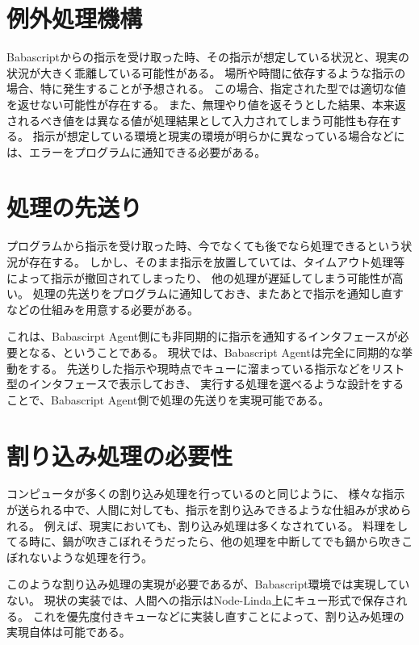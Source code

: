 \section{例外処理機構}\label{ux4f8bux5916ux51e6ux7406ux6a5fux69cb}

Babascriptからの指示を受け取った時、その指示が想定している状況と、現実の状況が大きく乖離している可能性がある。
場所や時間に依存するような指示の場合、特に発生することが予想される。
この場合、指定された型では適切な値を返せない可能性が存在する。
また、無理やり値を返そうとした結果、本来返されるべき値をは異なる値が処理結果として入力されてしまう可能性も存在する。
指示が想定している環境と現実の環境が明らかに異なっている場合などには、エラーをプログラムに通知できる必要がある。

\section{処理の先送り}\label{ux51e6ux7406ux306eux5148ux9001ux308a}

プログラムから指示を受け取った時、今でなくても後でなら処理できるという状況が存在する。
しかし、そのまま指示を放置していては、タイムアウト処理等によって指示が撤回されてしまったり、
他の処理が遅延してしまう可能性が高い。
処理の先送りをプログラムに通知しておき、またあとで指示を通知し直すなどの仕組みを用意する必要がある。

これは、Babascirpt
Agent側にも非同期的に指示を通知するインタフェースが必要となる、ということである。
現状では、Babascript Agentは完全に同期的な挙動をする。
先送りした指示や現時点でキューに溜まっている指示などをリスト型のインタフェースで表示しておき、
実行する処理を選べるような設計をすることで、Babascript
Agent側で処理の先送りを実現可能である。

\section{割り込み処理の必要性}\label{ux5272ux308aux8fbcux307fux51e6ux7406ux306eux5fc5ux8981ux6027}

コンピュータが多くの割り込み処理を行っているのと同じように、
様々な指示が送られる中で、人間に対しても、指示を割り込みできるような仕組みが求められる。
例えば、現実においても、割り込み処理は多くなされている。
料理をしてる時に、鍋が吹きこぼれそうだったら、他の処理を中断してでも鍋から吹きこぼれないような処理を行う。

このような割り込み処理の実現が必要であるが、Babascript環境では実現していない。
現状の実装では、人間への指示はNode-Linda上にキュー形式で保存される。
これを優先度付きキューなどに実装し直すことによって、割り込み処理の実現自体は可能である。

